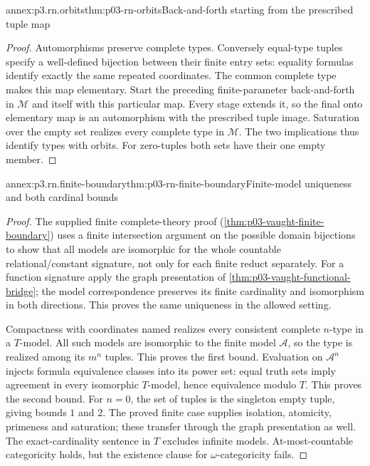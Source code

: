 \begin{annexitem}{annex:p3.rn.orbits}{thm:p03-rn-orbits}{Back-and-forth starting from the prescribed tuple map}
\begin{proof}
Automorphisms preserve complete types.
Conversely equal-type tuples specify a well-defined
bijection between their finite entry sets: equality
formulas identify exactly the same repeated coordinates.
The common complete type makes this map elementary.
Start the preceding finite-parameter back-and-forth in
\(\mathcal M\) and itself with this particular map.
Every stage extends it, so the final onto elementary
map is an automorphism with the prescribed tuple image.
Saturation over the empty set realizes every complete
type in \(\mathcal M\).
The two implications thus identify types with orbits.
For zero-tuples both sets have their one empty member.
\end{proof}
\end{annexitem}

\begin{annexitem}{annex:p3.rn.finite-boundary}{thm:p03-rn-finite-boundary}{Finite-model uniqueness and both cardinal bounds}
\begin{proof}
The supplied finite complete-theory proof
(\cref{thm:p03-vaught-finite-boundary}) uses a finite
intersection argument on the possible domain bijections
to show that all models are isomorphic for the whole
countable relational/constant signature, not only for
each finite reduct separately.
For a function signature apply the graph presentation
of \cref{thm:p03-vaught-functional-bridge}; the model
correspondence preserves its finite cardinality and
isomorphism in both directions.
This proves the same uniqueness in the allowed setting.

Compactness with coordinates named realizes every
consistent complete \(n\)-type in a \(T\)-model.
All such models are isomorphic to the finite model
\(\mathcal A\), so the type is realized among its
\(m^n\) tuples. This proves the first bound.
Evaluation on \(\mathcal A^n\) injects formula equivalence
classes into its power set: equal truth sets imply
agreement in every isomorphic \(T\)-model, hence
equivalence modulo \(T\). This proves the second bound.
For \(n=0\), the set of tuples is the singleton empty
tuple, giving bounds \(1\) and \(2\).
The proved finite case supplies isolation, atomicity,
primeness and saturation; these transfer through the
graph presentation as well.
The exact-cardinality sentence in \(T\) excludes
infinite models. At-most-countable categoricity holds,
but the existence clause for \(\omega\)-categoricity fails.
\end{proof}
\end{annexitem}


